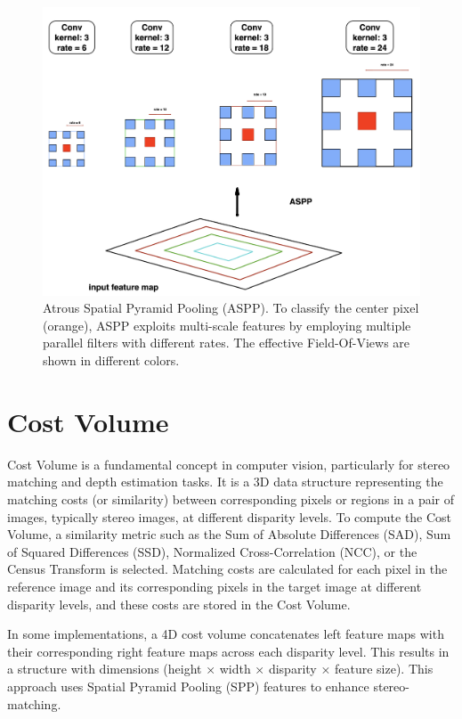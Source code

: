 \documentclass[english, LaM, oneside]{sapthesis}%
\begin{document}
\begin{figure}[h] %
    \centering
    \includegraphics[width=\linewidth]{Images/ASPP3.png}
    \caption{Atrous Spatial Pyramid Pooling (ASPP). To classify the center pixel (orange), ASPP exploits multi-scale features by employing multiple parallel filters with different rates. The effective Field-Of-Views are shown in different colors.}
    \label{fig:ASPP2}
\end{figure}

\section{Cost Volume}
Cost Volume is a fundamental concept in computer vision, particularly for stereo matching and depth estimation tasks. It is a 3D data structure representing the matching costs (or similarity) between corresponding pixels or regions in a pair of images, typically stereo images, at different disparity levels. To compute the Cost Volume, a similarity metric such as the Sum of Absolute Differences (SAD), Sum of Squared Differences (SSD), Normalized Cross-Correlation (NCC), or the Census Transform is selected. Matching costs are calculated for each pixel in the reference image and its corresponding pixels in the target image at different disparity levels, and these costs are stored in the Cost Volume.

In some implementations, a 4D cost volume concatenates left feature maps with their corresponding right feature maps across each disparity level. This results in a structure with dimensions (height × width × disparity × feature size). This approach uses Spatial Pyramid Pooling (SPP) features to enhance stereo-matching.
\end{document}
